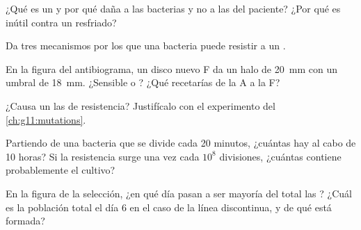 \begin{exercise}[$\star$]\label{exo:g11:antibiotic-resistance:2}
¿Qué es un  y por qué daña a las bacterias y no a las
 del paciente? ¿Por qué es inútil contra un resfriado?
\end{exercise}

\begin{exercise}[$\star$]\label{exo:g11:antibiotic-resistance:3}
Da tres mecanismos por los que una bacteria puede resistir a un
.
\end{exercise}

\begin{exercise}[$\star$]\label{exo:g11:antibiotic-resistance:4}
En la figura del antibiograma, un disco nuevo F da un halo de
\qty{20}{mm} con un umbral de \qty{18}{mm}. ¿Sensible o ?
¿Qué  recetarías de la A a la F?
\end{exercise}

\begin{exercise}[$\star$]\label{exo:g11:antibiotic-resistance:5}
¿Causa un  las  de resistencia? Justifícalo con el
experimento del \cref{ch:g11:mutations}.
\end{exercise}

\begin{exercise}[$\star\star$]\label{exo:g11:antibiotic-resistance:6}
Partiendo de una bacteria que se divide cada 20 minutos, ¿cuántas hay
al cabo de 10 horas? Si la resistencia surge una vez cada $10^8$
divisiones, ¿cuántas   contiene probablemente el
cultivo?
\end{exercise}

\begin{exercise}[$\star\star$]\label{exo:g11:antibiotic-resistance:7}
En la figura de la selección, ¿en qué día pasan a ser mayoría del total
las  ? ¿Cuál es la población total el día 6 en el caso
de la línea discontinua, y de qué está formada?
\end{exercise}


